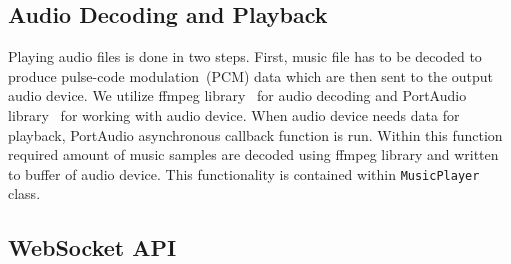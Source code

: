 \subsection{Audio Decoding and Playback}

Playing audio files is done in two steps. First, music file has to be decoded to produce pulse-code modulation~(PCM) data which are then sent to the output audio device.
We utilize ffmpeg library~\citep{ffmpeg} for audio decoding and PortAudio library~\citep{portaudio} for working with audio device. When audio device needs data for playback, PortAudio asynchronous callback function is run. Within this function required amount of music samples are decoded using ffmpeg library and written to buffer of audio device. This functionality is contained within \texttt{MusicPlayer} class.

\subsection{WebSocket API}

